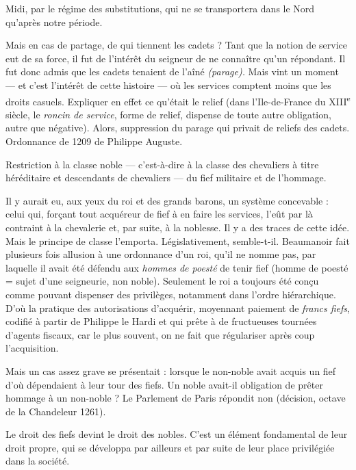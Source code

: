 \documentclass[french,twoside]{book} %
\newcommand{\labelchar}[1]{{\color{rubric}\bf #1}}
\begin{document}
\label{p67} Midi, par le régime des substitutions, qui ne se transportera dans le Nord qu’après notre période.\par
Mais en cas de partage, de qui tiennent les cadets ? Tant que la notion de service eut de sa force, il fut de l’intérêt du seigneur de ne connaître qu’un répondant. Il fut donc admis que les cadets tenaient de l’aîné {\itshape (parage).} Mais vint un moment — et c’est l’intérêt de cette histoire — où les services comptent moins que les droits casuels. Expliquer en effet ce qu’était le relief (dans l’Ile-de-France du XIII\textsuperscript{e} siècle, le \emph{roncin de service}, forme de relief, dispense de toute autre obligation, autre que négative). Alors, suppression du parage qui privait de reliefs des cadets. Ordonnance de 1209 de Philippe Auguste.\par
\bigbreak
\noindent \labelchar{f)} Restriction à la classe noble — c’est-à-dire à la classe des chevaliers à titre héréditaire et descendants de chevaliers — du fief militaire et de l’hommage.\par
Il y aurait eu, aux yeux du roi et des grands barons, un système concevable : celui qui, forçant tout acquéreur de fief à en faire les services, l’eût par là contraint à la chevalerie et, par suite, à la noblesse. Il y a des traces de cette idée. Mais le principe de classe l’emporta. Législativement, semble-t-il. Beaumanoir fait plusieurs fois allusion à une ordonnance d’un roi, qu’il ne nomme pas, par laquelle il avait été défendu aux \emph{hommes de poesté} de tenir fief (homme de poesté = sujet d’une seigneurie, non noble). Seulement le roi a toujours été conçu comme pouvant dispenser des privilèges, notamment dans l’ordre hiérarchique. D’où la pratique des autorisations d’acquérir, moyennant paiement de \emph{francs fiefs}, codifié à partir de Philippe le Hardi et qui prête à de fructueuses tournées d’agents fiscaux, car le plus souvent, on ne fait que régulariser après coup l’acquisition.\par
Mais un cas assez grave se présentait : lorsque le non-noble avait acquis un fief d’où dépendaient à leur tour des fiefs. Un noble avait-il obligation de prêter hommage à un non-noble ? Le Parlement de Paris répondit non (décision, octave de la Chandeleur 1261).\par
Le droit des fiefs devint le droit des nobles. C’est un élément fondamental de leur droit propre, qui se développa par ailleurs et par suite de leur place privilégiée dans la société.
\end{document}
